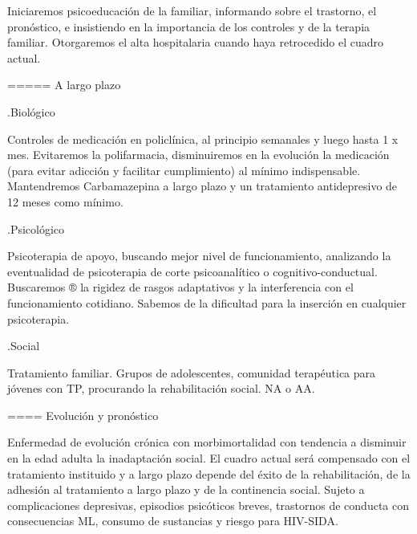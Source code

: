 \documentclass[encares.tex]{subfiles}
\begin{document}
Iniciaremos psicoeducación de la familiar, informando sobre el trastorno, el pronóstico, e insistiendo en la importancia de los controles y de la terapia familiar. Otorgaremos el alta hospitalaria cuando haya retrocedido el cuadro actual.

===== A largo plazo

.Biológico

Controles de medicación en policlínica, al principio semanales y luego hasta 1 x mes. Evitaremos la polifarmacia, disminuiremos en la evolución la medicación (para evitar adicción y facilitar cumplimiento) al mínimo indispensable. Mantendremos Carbamazepina a largo plazo y un tratamiento antidepresivo de 12 meses como mínimo.

.Psicológico

Psicoterapia de apoyo, buscando mejor nivel de funcionamiento, analizando la eventualidad de psicoterapia de corte psicoanalítico o cognitivo-conductual. Buscaremos ® la rigidez de rasgos adaptativos y la interferencia con el funcionamiento cotidiano. Sabemos de la dificultad para la inserción en cualquier psicoterapia.

.Social

Tratamiento familiar. Grupos de adolescentes, comunidad terapéutica para jóvenes con TP, procurando la rehabilitación social. NA o AA.

==== Evolución y pronóstico

Enfermedad de evolución crónica con morbimortalidad con tendencia a disminuir en la edad adulta la inadaptación social. El cuadro actual será compensado con el tratamiento instituido y a largo plazo depende del éxito de la rehabilitación, de la adhesión al tratamiento a largo plazo y de la continencia social. Sujeto a complicaciones depresivas, episodios psicóticos breves, trastornos de conducta con consecuencias ML, consumo de sustancias y riesgo para HIV-SIDA.
\end{document}
